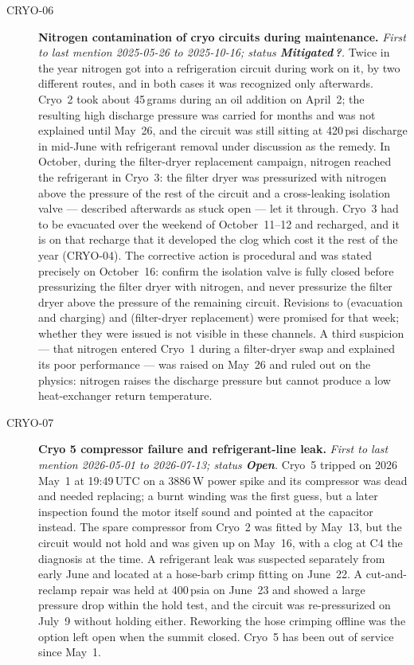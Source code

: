 \begin{description}
\item[CRYO-06]\label{iss:CRYO-06} \textbf{Nitrogen contamination of cryo circuits during maintenance.}
  \emph{First to last mention 2025-05-26 to 2025-10-16; status \textcolor{stmit}{\textbf{Mitigated}}\,\textbf{?}.}
  Twice in the year nitrogen got into a refrigeration circuit during work on it, by two different routes, and in both cases it was recognized only afterwards.  Cryo~2 took about 45\,grams during an oil addition on April~2; the resulting high discharge pressure was carried for months and was not explained until May~26, and the circuit was still sitting at 420\,psi discharge in mid-June with refrigerant removal under discussion as the remedy.  In October, during the filter-dryer replacement campaign, nitrogen reached the refrigerant in Cryo~3: the filter dryer was pressurized with nitrogen above the pressure of the rest of the circuit and a cross-leaking isolation valve --- described afterwards as stuck open --- let it through.  Cryo~3 had to be evacuated over the weekend of October~11--12 and recharged, and it is on that recharge that it developed the clog which cost it the rest of the year (CRYO-04).  The corrective action is procedural and was stated precisely on October~16: confirm the isolation valve is fully closed before pressurizing the filter dryer with nitrogen, and never pressurize the filter dryer above the pressure of the remaining circuit.  Revisions to  (evacuation and charging) and  (filter-dryer replacement) were promised for that week; whether they were issued is not visible in these channels.  A third suspicion --- that nitrogen entered Cryo~1 during a filter-dryer swap and explained its poor performance --- was raised on May~26 and ruled out on the physics: nitrogen raises the discharge pressure but cannot produce a low heat-exchanger return temperature.

\item[CRYO-07]\label{iss:CRYO-07} \textbf{Cryo 5 compressor failure and refrigerant-line leak.}
  \emph{First to last mention 2026-05-01 to 2026-07-13; status \textcolor{stopn}{\textbf{Open}}.}
  Cryo~5 tripped on 2026 May~1 at 19:49\,UTC on a 3886\,W power spike and its compressor was dead and needed replacing; a burnt winding was the first guess, but a later inspection found the motor itself sound and pointed at the capacitor instead.  The spare compressor from Cryo~2 was fitted by May~13, but the circuit would not hold and was given up on May~16, with a clog at C4 the diagnosis at the time.  A refrigerant leak was suspected separately from early June and located at a hose-barb crimp fitting on June~22.  A cut-and-reclamp repair was held at 400\,psia on June~23 and showed a large pressure drop within the hold test, and the circuit was re-pressurized on July~9 without holding either.  Reworking the hose crimping offline was the option left open when the summit closed.  Cryo~5 has been out of service since May~1.


\end{description}
